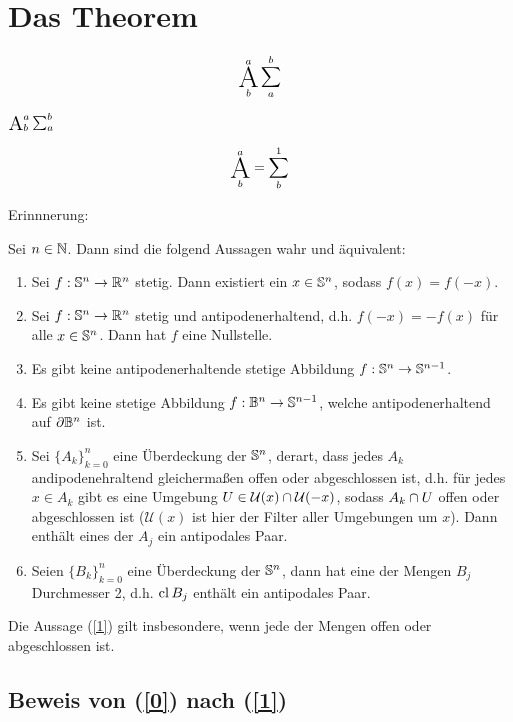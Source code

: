 \message{ !name(OnBorsukUlamsThoerem.tex)}\documentclass[10pt,a4paper]{article}
\def\Aop{\operatornamewithlimits{%
  \mathchoice{\vcenter{\hbox{\huge A}}}
             {\vcenter{\hbox{\Large A}}}
             {\mathrm{A}}
             {\mathrm{A}}}}
\begin{document}

\section{Das Theorem}

\[ \Aop^a_b \sum_a^b \]

$ \Aop^a_b \sum_a^b $

\[ \Aop^a_b =\sum^1_b\]

Erinnnerung:

\begin{theorem}[BU-Theorem]
Sei $n\in\mathbb{N}$. Dann sind die folgend Aussagen wahr und äquivalent:
\begin{enumerate}
\item Sei $f:\mathbb{S}^n\rightarrow \mathbb{R}^n$ stetig. Dann existiert ein $x\in\mathbb{S}^n$, sodass $f(x)=f(-x)$.\label{0}
\item Sei $f:\mathbb{S}^n\rightarrow \mathbb{R}^n$ stetig und antipodenerhaltend, d.h. $f(-x)=-f(x)$ für alle $x\in\mathbb{S}^n$. Dann hat $f$ eine Nullstelle.
\item Es gibt keine antipodenerhaltende stetige Abbildung $f:\mathbb{S}^n\rightarrow\mathbb{S}^{n-1}$.
\item Es gibt keine stetige Abbildung $f:\mathbb{B}^n\rightarrow\mathbb{S}^{n-1}$, welche antipodenerhaltend auf $\partial{\mathbb{B}^n}$ ist.
\item Sei $\{A_k\}_{k=0}^n$ eine Überdeckung der $\mathbb{S}^n$, derart, dass jedes $A_k$ andipodenehraltend gleichermaßen offen oder abgeschlossen ist, d.h. für jedes $x\in A_k$ gibt es eine Umgebung $U\in\mathcal{U}(x)\cap\mathcal{U}(-x)$, sodass $A_k\cap U$ offen oder abgeschlossen ist ($\mathcal{U}(x)$ ist hier der Filter aller Umgebungen um $x$). Dann enthält eines der $A_j$ ein antipodales Paar.\label{1} 
\item Seien $\{B_k\}_{k=0}^n$ eine Überdeckung der $\mathbb{S}^n$, dann hat eine der Mengen $B_j$ Durchmesser 2, d.h. $\operatorname{cl}{B_j}$ enthält ein antipodales Paar.
\end{enumerate}
\end{theorem}

\begin{remark}
Die Aussage (\ref{1}) gilt insbesondere, wenn jede der Mengen offen oder abgeschlossen ist.
\end{remark}

\subsection{Beweis von (\ref{0}) nach (\ref{1})}
\end{document}
